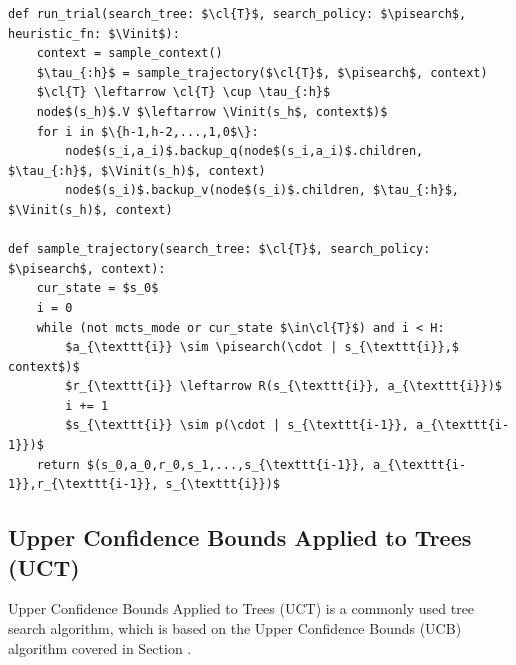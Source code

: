         \begin{lstlisting}[caption={Psuedocode for running a trial in \thtspp \todo{make each line nicely fit on one line}}, label={lst:thts_trial}]
def run_trial(search_tree: $\cl{T}$, search_policy: $\pisearch$, heuristic_fn: $\Vinit$):
    context = sample_context()
    $\tau_{:h}$ = sample_trajectory($\cl{T}$, $\pisearch$, context)
    $\cl{T} \leftarrow \cl{T} \cup \tau_{:h}$
    node$(s_h)$.V $\leftarrow \Vinit(s_h$, context$)$
    for i in $\{h-1,h-2,...,1,0$\}:
        node$(s_i,a_i)$.backup_q(node$(s_i,a_i)$.children, $\tau_{:h}$, $\Vinit(s_h)$, context)
        node$(s_i)$.backup_v(node$(s_i)$.children, $\tau_{:h}$, $\Vinit(s_h)$, context)

def sample_trajectory(search_tree: $\cl{T}$, search_policy: $\pisearch$, context):
    cur_state = $s_0$
    i = 0
    while (not mcts_mode or cur_state $\in\cl{T}$) and i < H:
        $a_{\texttt{i}} \sim \pisearch(\cdot | s_{\texttt{i}},$ context$)$ 
        $r_{\texttt{i}} \leftarrow R(s_{\texttt{i}}, a_{\texttt{i}})$
        i += 1
        $s_{\texttt{i}} \sim p(\cdot | s_{\texttt{i-1}}, a_{\texttt{i-1}})$
    return $(s_0,a_0,r_0,s_1,...,s_{\texttt{i-1}}, a_{\texttt{i-1}},r_{\texttt{i-1}}, s_{\texttt{i}})$
        \end{lstlisting}
        
        


    



    
    \subsection{Upper Confidence Bounds Applied to Trees (UCT)}
    \label{sec:2-4-2-uct}



        Upper Confidence Bounds Applied to Trees (UCT)  is a commonly used tree search algorithm, which is based on the Upper Confidence Bounds (UCB)  algorithm covered in Section . 

